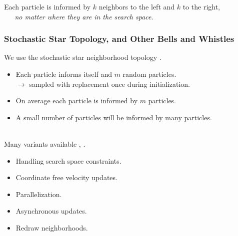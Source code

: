 \documentclass[xcolor=dvipsnames]{beamer}
\begin{document}
\begin{frame}
\begin{figure}
{
  }
  {
  }
\end{figure}
Each particle is informed by $k$ neighbors to the left and $k$ to the right,\\
\emph{\ \ \ no matter where they are in the search space}.
\end{frame}

\begin{frame}
\frametitle{Stochastic Star Topology, and Other Bells and Whistles}
We use the stochastic star neighborhood topology \citep{miranda2008stochastic}.
\begin{itemize}
\item Each particle informs itself and $m$ random particles.\\
$\to$ sampled with replacement once during initialization.
\item On average each particle is informed by $m$ particles.
\item A small number of particles will be informed by many particles.\\~\\
\end{itemize}

\pause

Many variants available \citep{clerc2011spso}, \citep[][appendix]{simpson2017adaptively}.
\begin{itemize}
\item Handling search space constraints.
\item Coordinate free velocity updates.
\item Parallelization.
\item Asynchronous updates.
\item Redraw neighborhoods.
\end{itemize}
\end{frame}
\end{document}
